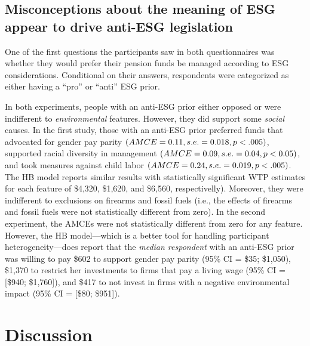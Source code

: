 \documentclass[
  12pt,
]{article}
\begin{document}
\hypertarget{misconceptions-about-the-meaning-of-esg-appear-to-drive-anti-esg-legislation}{%
\subsection{Misconceptions about the meaning of ESG appear to drive anti-ESG legislation}\label{misconceptions-about-the-meaning-of-esg-appear-to-drive-anti-esg-legislation}}

One of the first questions the participants saw in both questionnaires was whether they would prefer their pension funds be managed according to ESG considerations. Conditional on their answers, respondents were categorized as either having a ``pro'' or ``anti'' ESG prior.

In both experiments, people with an anti-ESG prior either opposed or were indifferent to \emph{environmental} features. However, they did support some \emph{social} causes. In the first study, those with an anti-ESG prior preferred funds that advocated for gender pay parity \((AMCE = 0.11, \space s.e.=0.018, \space p <.005)\), supported racial diversity in management \((AMCE = 0.09, \space s.e.=0.04, \space p <0.05)\), and took measures against child labor \((AMCE = 0.24, \space s.e.=0.019, \space p <.005)\). The HB model reports similar results with statistically significant WTP estimates for each feature of \$4,320, \$1,620, and \$6,560, respectivelly). Moreover, they were indifferent to exclusions on firearms and fossil fuels (i.e., the effects of firearms and fossil fuels were not statistically different from zero). In the second experiment, the AMCEs were not statistically different from zero for any feature. However, the HB model---which is a better tool for handling participant heterogeneity---does report that the \emph{median respondent} with an anti-ESG prior was willing to pay \$602 to support gender pay parity (95\% CI = \$35; \$1,050), \$1,370 to restrict her investments to firms that pay a living wage (95\% CI = {[}\$940; \$1,760{]}), and \$417 to not invest in firms with a negative environmental impact (95\% CI = {[}\$80; \$951{]}).

\hypertarget{discussion}{%
\section{Discussion}\label{discussion}}
\end{document}
